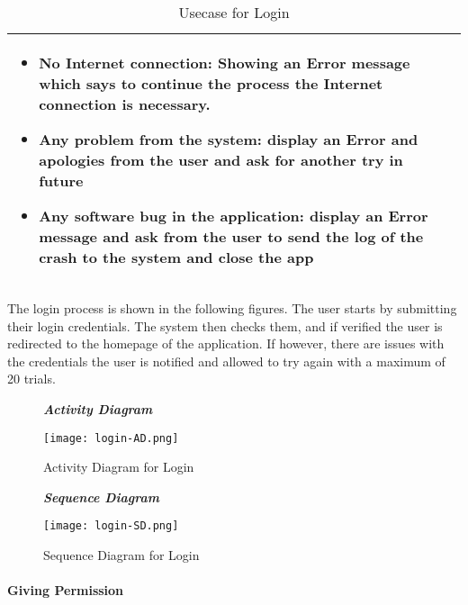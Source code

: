 \begin{table}[H]
\begin{tabulary}{\textwidth}{|J|J|}
\begin{minipage}[t]{0.8\textwidth}
\begin{itemize}
\item No Internet connection: Showing an Error message which says to continue the process the Internet connection is necessary.
\item Any problem from the system: display an Error and apologies from the user and ask for another try in future
\item Any software bug in the application: display an Error message and ask from the user to send the log of the crash to the system and close the app
\end{itemize}
\end{minipage}\\
\hline
\end{tabulary}
\caption{\label{tab:Usecase-Login}Usecase for Login}
\end{table}

The login process is shown in the following figures. The user starts by submitting their login credentials. The system then checks them, and if verified the user is redirected to the homepage of the application. If however, there are issues with the credentials the user is notified and allowed to try again with a maximum of 20 trials.

\begin{figure}[H]
\begin{flushleft}\emph{\textbf{Activity Diagram}}\end{flushleft}
\caption{Activity Diagram for Login}
\label{fig:AD-login}
\centering
\texttt{[image: login-AD.png]}
\end{figure}

\begin{figure}[H]
\begin{flushleft}\emph{\textbf{Sequence Diagram}}\end{flushleft}
\caption{Sequence Diagram for Login}
\label{fig:SD-login}
\centering
\texttt{[image: login-SD.png]}
\end{figure}

\paragraph{Giving Permission}
\hfill \break

